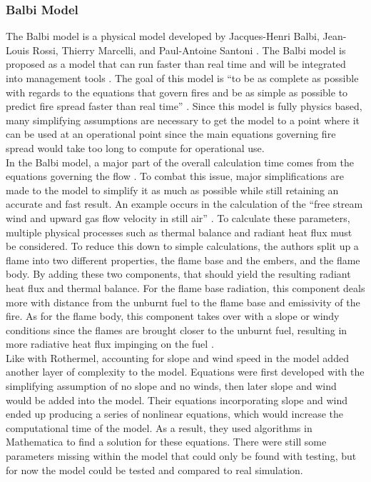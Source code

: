 \documentclass{article}
\begin{document}
\subsubsection{Balbi Model}
\indent The Balbi model is a physical model developed by Jacques-Henri Balbi, Jean-Louis Rossi, Thierry Marcelli, and Paul-Antoine Santoni \citep{Balbi2007}. The Balbi model is proposed as a model that can run faster than real time and will be integrated into management tools \citep{Balbi2007}. The goal of this model is “to be as complete as possible with regards to the equations that govern fires and be as simple as possible to predict fire spread faster than real time” \citep{Balbi2007}. Since this model is fully physics based, many simplifying assumptions are necessary to get the model to a point where it can be used at an operational point since the main equations governing fire spread would take too long to compute for operational use. \\
\indent In the Balbi model, a major part of the overall calculation time comes from the equations governing the flow \citep{Balbi2007}. To combat this issue, major simplifications are made to the model to simplify it as much as possible while still retaining an accurate and fast result. An example occurs in the calculation of the “free stream wind and upward gas flow velocity in still air” \citep{Balbi2007}. To calculate these parameters, multiple physical processes such as thermal balance and radiant heat flux must be considered. To reduce this down to simple calculations, the authors split up a flame into two different properties, the flame base and the embers, and the flame body. By adding these two components, that should yield the resulting radiant heat flux and thermal balance. For the flame base radiation, this component deals more with distance from the unburnt fuel to the flame base and emissivity of the fire. As for the flame body, this component takes over with a slope or windy conditions since the flames are brought closer to the unburnt fuel, resulting in more radiative heat flux impinging on the fuel \citep{Balbi2007}. \\
\indent Like with Rothermel, accounting for slope and wind speed in the model added another layer of complexity to the model. Equations were first developed with the simplifying assumption of no slope and no winds, then later slope and wind would be added into the model. Their equations incorporating slope and wind ended up producing a series of nonlinear equations, which would increase the computational time of the model. As a result, they used algorithms in Mathematica to find a solution for these equations. There were still some parameters missing within the model that could only be found with testing, but for now the model could be tested and compared to real simulation. \\
\end{document}
